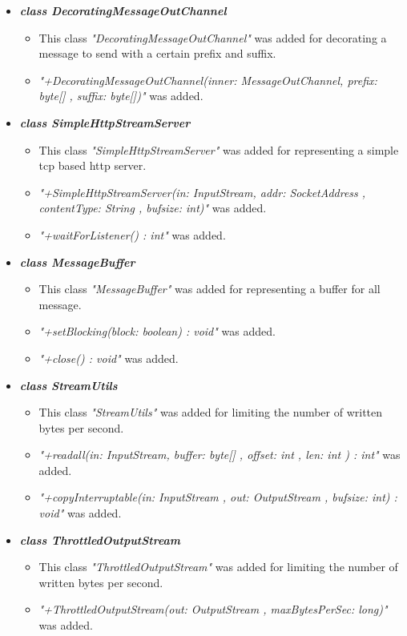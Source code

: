 \documentclass[a4paper,10pt]{scrartcl}
\begin{document}
\begin{itemize}
   \item \textbf{\textit{class DecoratingMessageOutChannel}}
	\begin{itemize}
	 \item This class \textit{"DecoratingMessageOutChannel"} was added for decorating 
	 a message to send with a certain prefix and suffix.
	 \item \textit{"+DecoratingMessageOutChannel(inner: MessageOutChannel, prefix: byte[] , suffix: byte[])"} was added. 
	\end{itemize}
	 
	\item \textbf{\textit{class SimpleHttpStreamServer}}
	\begin{itemize}
	 \item This class \textit{"SimpleHttpStreamServer"} was added for representing a simple tcp based http server.
	 \item \textit{"+SimpleHttpStreamServer(in: InputStream, addr: SocketAddress , contentType:  String , bufsize:  int)"} 
	 was added.
	 \item \textit{"+waitForListener() : int"} was added.
	\end{itemize}
	
   \item \textbf{\textit{class MessageBuffer}}
	\begin{itemize}
	 \item This class \textit{"MessageBuffer"} was added for representing a buffer for all message.
	 \item \textit{"+setBlocking(block: boolean) : void"} was added. 
	 \item \textit{"+close() : void"} was added. 
	\end{itemize}
	
	 \item \textbf{\textit{class StreamUtils}}
	\begin{itemize}
	 \item This class \textit{"StreamUtils"} was added for limiting the number of written bytes per second.
	 \item \textit{"+readall(in: InputStream, buffer: byte[] , offset: int , len: int ) : int"} was added.
	 \item \textit{"+copyInterruptable(in: InputStream , out: OutputStream , bufsize: int) : void"} was added.
	\end{itemize}
	
	 \item \textbf{\textit{class ThrottledOutputStream}}
	\begin{itemize}
	 \item This class \textit{"ThrottledOutputStream"} was added for limiting the number of written bytes per second.
	 \item \textit{"+ThrottledOutputStream(out: OutputStream , maxBytesPerSec: long)"} was added. 
	\end{itemize}
	

\end{itemize}
\end{document}
